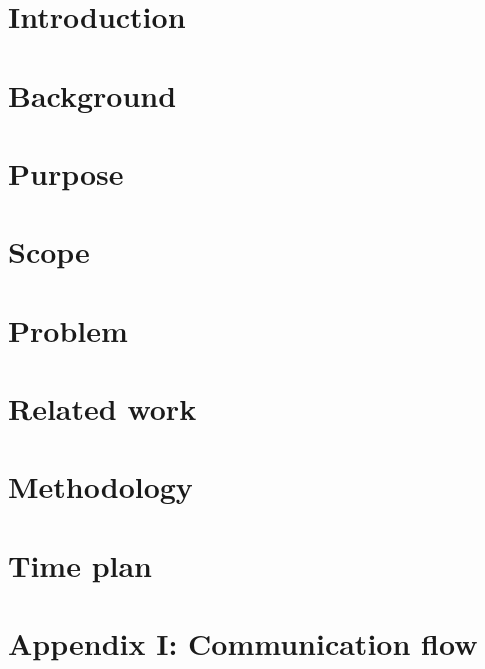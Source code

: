 \documentclass[Report.tex]{subfiles}
\begin{document}
\chapter{Introduction}
	
\chapter{Background}
	

\chapter{Purpose}
	
    
\chapter{Scope}
	

\chapter{Problem}



\chapter{Related work}



\chapter{Methodology}


\chapter{Time plan}


\nocite{*} %
 
\printbibliography%

\chapter*{Appendix I: Communication flow}

\end{document}
